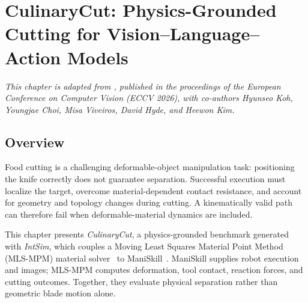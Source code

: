 
\clearpage
\chapter{CulinaryCut: Physics-Grounded Cutting for Vision--Language--Action Models}
\label{CH5_CUTTINGSIM}

\noindent\textit{This chapter is adapted from \citet{koh2026culinarycut}, published in the proceedings of the European Conference on Computer Vision (ECCV 2026), with co-authors Hyunseo Koh, Youngjae Choi, Misa Viveiros, David Hyde, and Heewon Kim.}

\providecommand{\CutTableSetup}{%
  \small
  \setstretch{1}%
  \setlength{\tabcolsep}{3.5pt}%
  \renewcommand{\arraystretch}{1.16}%
}

\section{Overview}
\label{sec:cut_overview}

Food cutting is a challenging deformable-object manipulation task: positioning the knife correctly does not guarantee separation. Successful execution must localize the target, overcome material-dependent contact resistance, and account for geometry and topology changes during cutting. A kinematically valid path can therefore fail when deformable-material dynamics are included.

This chapter presents \emph{CulinaryCut}, a physics-grounded benchmark generated with \emph{IntSim}, which couples a Moving Least Squares Material Point Method (MLS-MPM) material solver~\citep{2018-MLSMPM} to ManiSkill~\citep{gu2023ManiSkill2}. ManiSkill supplies robot execution and images; MLS-MPM computes deformation, tool contact, reaction forces, and cutting outcomes. Together, they evaluate physical separation rather than geometric blade motion alone.

